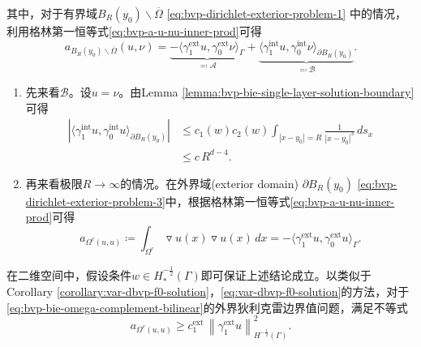 其中，对于有界域$ B_{R}(y_{0}) \backslash \overline{\Omega}$ \eqref{eq:bvp-dirichlet-exterior-problem-1} 中的情况，利用格林第一恒等式\eqref{eq:bvp-a-u-nu-inner-prod}可得
\begin{equation}
  \label{eq:bvp-dirichlet-exterior-green1}
  a_{B_{R}(y_{0}) \backslash \overline{\Omega}} (u, \nu)
  = \underbrace{
  - \langle \gamma_{1}^{\text{ext}} u, \gamma_{0}^{\text{ext}} \nu \rangle_{\Gamma}
  }_{\eqqcolon \mathcal{A}}
  + \underbrace{
  \langle \gamma_{1}^{\text{int}} u, \gamma_{0}^{\text{int}} \nu \rangle_{\partial B_{R}(y_{0})}
  }_{\eqqcolon \mathcal{B}}
  .
\end{equation}
\begin{enumerate}
  \item 先来看$\mathcal{B}$。设$u = \nu$。由Lemma \ref{lemma:bvp-bie-single-layer-solution-boundary}可得
  \begin{equation*}
    \begin{split}
      \left| \langle
      \gamma_{1}^{\text{int}} u, \gamma_{0}^{\text{int}} u
      \rangle_{\partial B_{R}(y_{0})} \right|
      & \le c_{1}(w) c_{2}(w)
      \int_{\left| x - y_{0} \right| = R}
      \frac{1}{\left| x - y_{0} \right|^{3}} \, d s_{x} \\
      & \le c \, R^{d-4}.
    \end{split}
  \end{equation*}

  \item 再来看极限$R \rightarrow \infty$的情况。在外界域(exterior domain) $\partial B_{R}(y_{0})$ \eqref{eq:bvp-dirichlet-exterior-problem-3}中，根据格林第一恒等式\eqref{eq:bvp-a-u-nu-inner-prod}可得
  \begin{equation}
    \label{eq:bvp-bie-omega-complement-bilinear}
      a_{\Omega^{c}(u, u)} \coloneqq \int_{\Omega^{c}}
      \triangledown u(x)
      \triangledown u(x)
      \, dx
      = - \langle \gamma_{1}^{\text{ext}} u, \gamma_{0}^{\text{ext}} u \rangle_{\Gamma}.
  \end{equation}
\end{enumerate}

在二维空间中，假设条件$w \in H_{*}^{-\frac{1}{2}}(\Gamma)$即可保证上述结论成立。以类似于Corollary \ref{corollary:var-dbvp-f0-solution}，\eqref{eq:var-dbvp-f0-solution}的方法，对于\eqref{eq:bvp-bie-omega-complement-bilinear}的外界狄利克雷边界值问题，满足不等式
\begin{equation}
  \label{eq:bvp-bie-omega-complement-bilinear-ineq}
  a_{\Omega^{c}(u,u)} \ge c_{1}^{\text{ext}} \,
  \left\| \gamma_{1}^{\text{ext}} u \right\|_{H^{-\frac{1}{2}}(\Gamma)}^{2}.
\end{equation}

